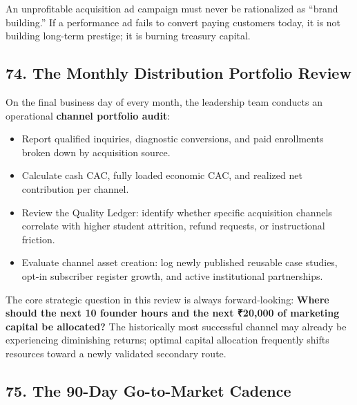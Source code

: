 An unprofitable acquisition ad campaign must never be rationalized as ``brand building.'' If a performance ad fails to convert paying customers today, it is not building long-term prestige; it is burning treasury capital.

\subsection*{74. The Monthly Distribution Portfolio Review}

On the final business day of every month, the leadership team conducts an operational \textbf{channel portfolio audit}:
\begin{itemize}[leftmargin=*,itemsep=1pt]
  \item Report qualified inquiries, diagnostic conversions, and paid enrollments broken down by acquisition source.
  \item Calculate cash CAC, fully loaded economic CAC, and realized net contribution per channel.
  \item Review the Quality Ledger: identify whether specific acquisition channels correlate with higher student attrition, refund requests, or instructional friction.
  \item Evaluate channel asset creation: log newly published reusable case studies, opt-in subscriber register growth, and active institutional partnerships.
\end{itemize}

The core strategic question in this review is always forward-looking: \textbf{Where should the next 10 founder hours and the next ₹20,000 of marketing capital be allocated?} The historically most successful channel may already be experiencing diminishing returns; optimal capital allocation frequently shifts resources toward a newly validated secondary route.

\subsection*{75. The 90-Day Go-to-Market Cadence}

